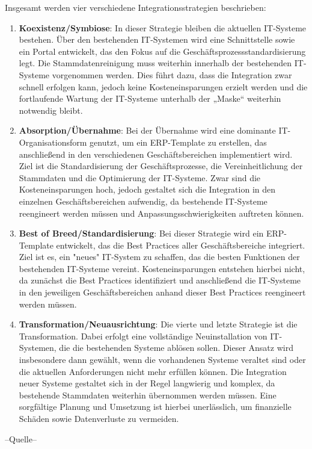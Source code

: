 \documentclass[a4paper,12pt]{article}
\begin{document}
Insgesamt werden vier verschiedene Integrationsstrategien beschrieben:
\begin{enumerate}
    \item \textbf{Koexistenz/Symbiose}: \newline
    In dieser Strategie bleiben die aktuellen IT-Systeme bestehen.
    Über den bestehenden IT-Systemen wird eine Schnittstelle sowie ein Portal entwickelt, das den Fokus auf die Geschäftsprozessstandardisierung legt.
    Die Stammdatenreinigung muss weiterhin innerhalb der bestehenden IT-Systeme vorgenommen werden.
    Dies führt dazu, dass die Integration zwar schnell erfolgen kann, 
    jedoch keine Kosteneinsparungen erzielt werden und die fortlaufende Wartung der IT-Systeme 
    unterhalb der „Maske“ weiterhin notwendig bleibt. 
    \item \textbf{Absorption/Übernahme}:\newline
    Bei der Übernahme wird eine dominante IT-Organisationsform genutzt, um ein ERP-Template zu erstellen,
    das anschließend in den verschiedenen Geschäftsbereichen implementiert wird. Ziel ist die Standardisierung der Geschäftsprozesse,
    die Vereinheitlichung der Stammdaten und die Optimierung der IT-Systeme.
    Zwar sind die Kosteneinsparungen hoch, jedoch gestaltet sich die Integration in den einzelnen Geschäftsbereichen aufwendig,
    da bestehende IT-Systeme reengineert werden müssen und Anpassungsschwierigkeiten auftreten können.
    \item \textbf{Best of Breed/Standardisierung}:\newline
    Bei dieser Strategie wird ein ERP-Template entwickelt, das die Best Practices aller Geschäftsbereiche integriert.
    Ziel ist es, ein "neues" IT-System zu schaffen, das die besten Funktionen der bestehenden IT-Systeme vereint.
    Kosteneinsparungen entstehen hierbei nicht, da zunächst die Best Practices identifiziert und anschließend die IT-Systeme
    in den jeweiligen Geschäftsbereichen anhand dieser Best Practices reengineert werden müssen.
    \item \textbf{Transformation/Neuausrichtung}:\newline
    Die vierte und letzte Strategie ist die Transformation.
    Dabei erfolgt eine vollständige Neuinstallation von IT-Systemen, die die bestehenden Systeme ablösen sollen.
    Dieser Ansatz wird insbesondere dann gewählt, wenn die vorhandenen Systeme veraltet sind oder die aktuellen Anforderungen nicht mehr erfüllen können.
    Die Integration neuer Systeme gestaltet sich in der Regel langwierig und komplex, da bestehende Stammdaten weiterhin übernommen werden müssen.
    Eine sorgfältige Planung und Umsetzung ist hierbei unerlässlich, um finanzielle Schäden sowie Datenverluste zu vermeiden.
\end{enumerate}
--Quelle--\cite[Kapitel 4.2]{Gronwald2020}
\end{document}
